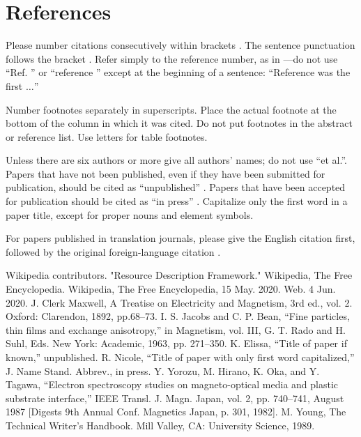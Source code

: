 \documentclass[conference]{IEEEtran}
\begin{document}
\section*{References}

Please number citations consecutively within brackets \cite{b1}. The 
sentence punctuation follows the bracket \cite{b2}. Refer simply to the reference 
number, as in \cite{b3}---do not use ``Ref. \cite{b3}'' or ``reference \cite{b3}'' except at 
the beginning of a sentence: ``Reference \cite{b3} was the first $\ldots$''

Number footnotes separately in superscripts. Place the actual footnote at 
the bottom of the column in which it was cited. Do not put footnotes in the 
abstract or reference list. Use letters for table footnotes.

Unless there are six authors or more give all authors' names; do not use 
``et al.''. Papers that have not been published, even if they have been 
submitted for publication, should be cited as ``unpublished'' \cite{b4}. Papers 
that have been accepted for publication should be cited as ``in press'' \cite{b5}. 
Capitalize only the first word in a paper title, except for proper nouns and 
element symbols.

For papers published in translation journals, please give the English 
citation first, followed by the original foreign-language citation \cite{b6}.

\begin{thebibliography}{00}
 Wikipedia contributors. "Resource Description Framework." Wikipedia, The Free Encyclopedia. Wikipedia, The Free Encyclopedia, 15 May. 2020. Web. 4 Jun. 2020.
 J. Clerk Maxwell, A Treatise on Electricity and Magnetism, 3rd ed., vol. 2. Oxford: Clarendon, 1892, pp.68--73.
 I. S. Jacobs and C. P. Bean, ``Fine particles, thin films and exchange anisotropy,'' in Magnetism, vol. III, G. T. Rado and H. Suhl, Eds. New York: Academic, 1963, pp. 271--350.
 K. Elissa, ``Title of paper if known,'' unpublished.
 R. Nicole, ``Title of paper with only first word capitalized,'' J. Name Stand. Abbrev., in press.
 Y. Yorozu, M. Hirano, K. Oka, and Y. Tagawa, ``Electron spectroscopy studies on magneto-optical media and plastic substrate interface,'' IEEE Transl. J. Magn. Japan, vol. 2, pp. 740--741, August 1987 [Digests 9th Annual Conf. Magnetics Japan, p. 301, 1982].
 M. Young, The Technical Writer's Handbook. Mill Valley, CA: University Science, 1989.
\end{thebibliography}
\end{document}
